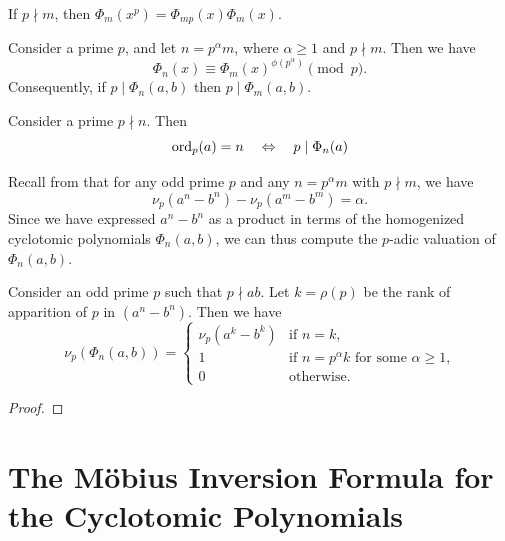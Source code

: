 \begin{lemma}
  If $p\nmid m$, then $\Phi_m(x^p)=\Phi_{mp}(x)\Phi_m(x)$.
\end{lemma}

\begin{lemma}
  Consider a prime $p$, and let $n=p^\alpha m$, where $\alpha\geq 1$ and $p\nmid m$. Then we have
  \begin{equation*}
    \Phi_n(x)\equiv \Phi_m(x)^{\phi(p^\alpha)}\pmod{p}.
  \end{equation*}
  Consequently, if $p\mid\Phi_n(a,b)$ then $p\mid \Phi_m(a,b)$.
\end{lemma}

\begin{proposition}
  Consider a prime $p\nmid n$. Then 
  \begin{equation*}
    \operatorname{ord}_p(a)= n \quad\Leftrightarrow\quad p\mid \Phi_n(a)
  \end{equation*}
\end{proposition}

Recall from  that for any odd prime $p$ and any $n=p^\alpha m$ with $p\nmid m$, we have
\begin{equation*}
  \nu_p(a^n-b^n)-\nu_p(a^m-b^m)=\alpha.
\end{equation*}
Since we have expressed $a^n-b^n$ as a product in terms of the homogenized cyclotomic polynomials $\Phi_n(a,b)$, we can thus compute the $p$-adic valuation of $\Phi_n(a,b)$.

\begin{proposition}\label{proposition:valuation-homogenized-cyclotomics}
  Consider an odd prime $p$ such that $p\nmid ab$. Let $k=\rho(p)$ be the rank of apparition of $p$ in $(a^n-b^n)$. Then we have
  \begin{equation*}
    \nu_p(\Phi_n(a,b)) =
    \begin{cases}
      \nu_p(a^k-b^k) & \text{if $n=k$,} \\
      1 & \text{if $n=p^\alpha k$ for some $\alpha\geq 1$,} \\
      0 & \text{otherwise.}
    \end{cases}
  \end{equation*}
\end{proposition}

\begin{proof}
  
\end{proof}

\section{The M\"obius Inversion Formula for the Cyclotomic Polynomials}

